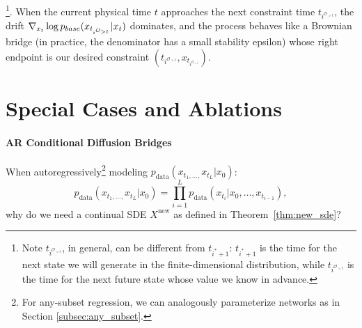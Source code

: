 \documentclass{article}
\newcommand{\pbase}{p_{\normalfont{base}}}
\begin{document}
\footnote{Note $t_{i^{\mathcal{O}_{>t}}}$, in general, can be different from $t_{i^*+1}$: $t_{i^*+1}$ is the time for the next state we will generate in the finite-dimensional distribution, while $t_{i^{\mathcal{O}_{>t}}}$ is the time for the next future state whose value we know in advance.}.
When the current physical time $t$ approaches the next constraint time $t_{i^{\mathcal{O}_{>t}}}$, the drift $\nabla_{x_t} \log \pbase(x_{t_{i^{\mathcal{O}_{>t}}}}\vert x_t)$ dominates, and the process behaves
like a Brownian bridge (in practice, the denominator has a small stability epsilon) whose right endpoint is our desired constraint $(t_{i^{\mathcal{O}_{>t}}}, x_{t_{i^{\mathcal{O}_{>t}}}})$.%

\section{Special Cases and Ablations}\label{sec:ablation}

\paragraph{AR Conditional Diffusion Bridges}%

When autoregressively\footnote{For any-subset regression, we can analogously parameterize networks as in Section \ref{subsec:any_subset}.} %
modeling $p_\text{data}(x_{t_1, \ldots, }x_{t_L} | x_0)$:
\begin{equation}\label{eqn:cond_bridge_autoregressive_factorization}
    p_\text{data}(x_{t_1, \ldots, }x_{t_L} | x_0) = \prod_{i=1}^{L}p_\text{data}(x_{t_i} | x_0, \ldots, x_{t_{i-1}}),
\end{equation}
why do we need a continual SDE $X^{\text{new}}$ as defined in Theorem~\ref{thm:new_sde}?
\end{document}
